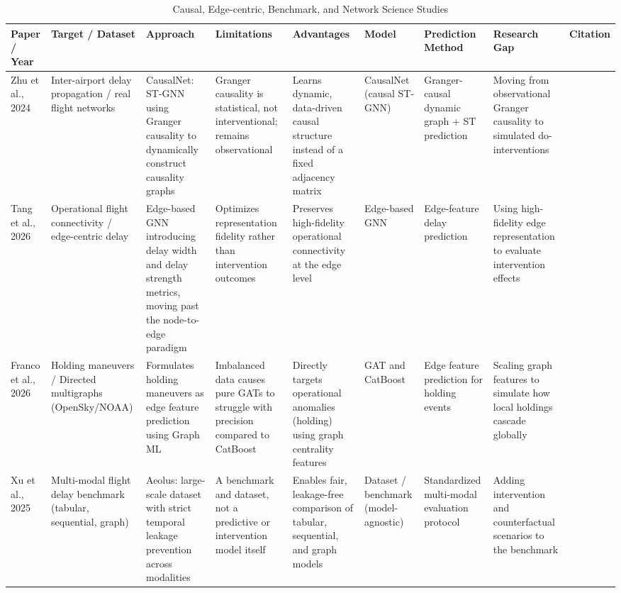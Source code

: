 \documentclass[twocolumn]{article}
\begin{document}
\begin{table}[htbp]
\centering
\setlength{\tabcolsep}{0.8\tabcolsep}
\def\arraystretch{1.5}
\caption{Causal, Edge-centric, Benchmark, and Network Science Studies}
\begin{tabular}{|p{1.5cm}|p{1.5cm}|p{2.5cm}|p{2cm}|p{2cm}|p{1.5cm}|p{1.5cm}|p{1.5cm}|p{1cm}|}
\rowcolor{gray!25}
\hline
\textbf{Paper / Year} & \textbf{Target / Dataset} & \textbf{Approach} & \textbf{Limitations} & \textbf{Advantages} & \textbf{Model} & \textbf{Prediction Method} & \textbf{Research Gap} & \textbf{Citation} \\
\hline
Zhu et al., 2024 & Inter-airport delay propagation / real flight networks & CausalNet: ST-GNN using Granger causality to dynamically construct causality graphs & Granger causality is statistical, not interventional; remains observational & Learns dynamic, data-driven causal structure instead of a fixed adjacency matrix & CausalNet (causal ST-GNN) & Granger-causal dynamic graph + ST prediction & Moving from observational Granger causality to simulated do-interventions & \cite{zhu2024}\\
\hline
Tang et al., 2026 & Operational flight connectivity / edge-centric delay & Edge-based GNN introducing delay width and delay strength metrics, moving past the node-to-edge paradigm & Optimizes representation fidelity rather than intervention outcomes & Preserves high-fidelity operational connectivity at the edge level & Edge-based GNN & Edge-feature delay prediction & Using high-fidelity edge representation to evaluate intervention effects & \cite{tang2026}\\
\hline
Franco et al., 2026 & Holding maneuvers / Directed multigraphs (OpenSky/NOAA) & Formulates holding maneuvers as edge feature prediction using Graph ML & Imbalanced data causes pure GATs to struggle with precision compared to CatBoost & Directly targets operational anomalies (holding) using graph centrality features & GAT and CatBoost & Edge feature prediction for holding events & Scaling graph features to simulate how local holdings cascade globally & \cite{franco2026}\\
\hline
Xu et al., 2025 & Multi-modal flight delay benchmark (tabular, sequential, graph) & Aeolus: large-scale dataset with strict temporal leakage prevention across modalities & A benchmark and dataset, not a predictive or intervention model itself & Enables fair, leakage-free comparison of tabular, sequential, and graph models & Dataset / benchmark (model-agnostic) & Standardized multi-modal evaluation protocol & Adding intervention and counterfactual scenarios to the benchmark & \cite{xu2025}\\

\end{tabular}
\end{table}
\end{document}
